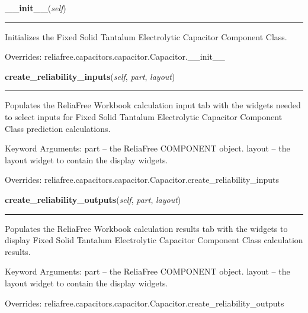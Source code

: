     \vspace{0.5ex}

\hspace{.8\funcindent}\begin{boxedminipage}{\funcwidth}

    \raggedright \textbf{\_\_init\_\_}(\textit{self})

    \vspace{-1.5ex}

    \rule{\textwidth}{0.5\fboxrule}
\setlength{\parskip}{2ex}
    Initializes the Fixed Solid Tantalum Electrolytic Capacitor Component 
    Class.

\setlength{\parskip}{1ex}
      Overrides: reliafree.capacitors.capacitor.Capacitor.\_\_init\_\_

    \end{boxedminipage}

    \vspace{0.5ex}

\hspace{.8\funcindent}\begin{boxedminipage}{\funcwidth}

    \raggedright \textbf{create\_reliability\_inputs}(\textit{self}, \textit{part}, \textit{layout})

    \vspace{-1.5ex}

    \rule{\textwidth}{0.5\fboxrule}
\setlength{\parskip}{2ex}
    Populates the ReliaFree Workbook calculation input tab with the widgets
    needed to select inputs for Fixed Solid Tantalum Electrolytic Capacitor
    Component Class prediction calculations.

    Keyword Arguments: part   -- the ReliaFree COMPONENT object. layout -- 
    the layout widget to contain the display widgets.

\setlength{\parskip}{1ex}
      Overrides: reliafree.capacitors.capacitor.Capacitor.create\_reliability\_inputs

    \end{boxedminipage}

    \vspace{0.5ex}

\hspace{.8\funcindent}\begin{boxedminipage}{\funcwidth}

    \raggedright \textbf{create\_reliability\_outputs}(\textit{self}, \textit{part}, \textit{layout})

    \vspace{-1.5ex}

    \rule{\textwidth}{0.5\fboxrule}
\setlength{\parskip}{2ex}
    Populates the ReliaFree Workbook calculation results tab with the 
    widgets to display Fixed Solid Tantalum Electrolytic Capacitor 
    Component Class calculation results.

    Keyword Arguments: part   -- the ReliaFree COMPONENT object. layout -- 
    the layout widget to contain the display widgets.

\setlength{\parskip}{1ex}
      Overrides: reliafree.capacitors.capacitor.Capacitor.create\_reliability\_outputs

    \end{boxedminipage}

